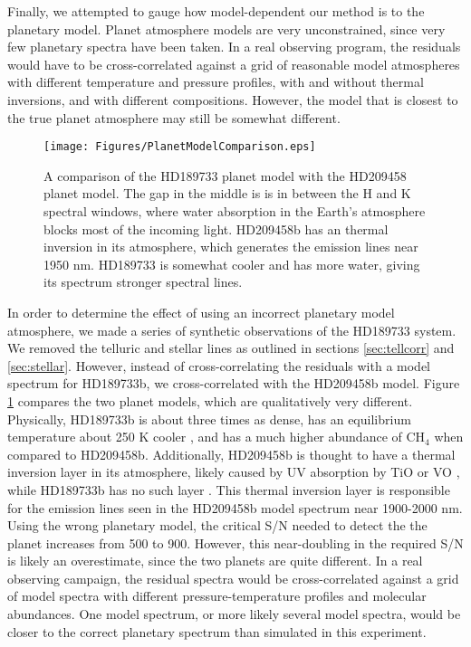 \documentclass[11pt]{report}     %
\begin{document}
Finally, we attempted to gauge how model-dependent our method is to
the planetary model. Planet atmosphere models are very unconstrained,
since very few planetary spectra have been taken. In a real observing
program, the residuals would have to be cross-correlated against a
grid of reasonable model atmospheres with different temperature and
pressure profiles, with and without thermal inversions, and with
different compositions. However, the model that is
closest to the true planet atmosphere may still be somewhat
different. 

\begin{figure}[ht]
  \centering
  \texttt{[image: Figures/PlanetModelComparison.eps]}
  \caption{A comparison of the HD189733 planet model with the HD209458
  planet model. The gap in the middle is is in between the H and K
  spectral windows, where water absorption in the Earth's atmosphere
  blocks most of the incoming light. HD209458b has an thermal inversion
  in its atmosphere, which generates the emission lines near 1950
  nm. HD189733 is somewhat cooler and has more water, giving its
  spectrum stronger spectral lines.}
  \label{fig:modelcomp}
\end{figure}

In order to determine the effect of using an incorrect
planetary model atmosphere, we made a series of synthetic observations
of the HD189733 system. We removed the telluric and stellar lines as
outlined in sections \ref{sec:tellcorr} and
\ref{sec:stellar}. However, instead of cross-correlating the residuals
with a model spectrum for HD189733b, we cross-correlated with the
HD209458b model. Figure \ref{fig:modelcomp} compares the two planet
models, which are qualitatively very different. Physically, HD189733b is about three times as dense, 
has an equilibrium temperature about 250 K cooler \citep{Torres2008}, and has a 
much higher abundance of CH$_4$ \citep{Moses2011} when compared to HD209458b. Additionally,
HD209458b is thought to have a thermal inversion layer in its atmosphere, likely caused by UV absorption by TiO or VO
\citep{Knutson2008}, while HD189733b has no such layer \citep{Char2008}. This thermal inversion layer is responsible
for the emission lines seen in the HD209458b model spectrum near 1900-2000 nm. Using the wrong planetary model, the
critical S/N needed to detect the the planet increases from 500 to 900. However, this near-doubling in the 
required S/N is likely an overestimate, since the two planets are quite different. In a real observing campaign,
the residual spectra would be cross-correlated against a grid of model spectra with different pressure-temperature
profiles and molecular abundances. One model spectrum, or more likely several model spectra, would be closer to the correct 
planetary spectrum than simulated in this experiment.
\end{document}
